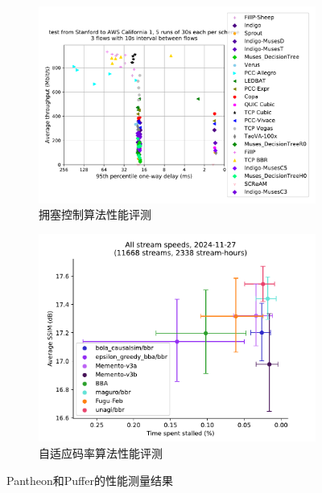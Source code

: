 \begin{figure}[ht]
\centering
\begin{subfigure}[t]{0.49\linewidth}
  \centering
  \includegraphics[width=\linewidth]{figures/chap02/measument-ccabr/cc.pdf}
  \caption{拥塞控制算法性能评测}
  \label{fig-measument-ccabr-cc}
\end{subfigure}%
\begin{subfigure}[t]{0.49\linewidth}
  \centering
  \includegraphics[width=\linewidth]{figures/chap02/measument-ccabr/abr.pdf}
  \caption{自适应码率算法性能评测}
  \label{fig-measument-ccabr-abr}
\end{subfigure}

\caption{Pantheon\cite{yan2018pantheon}和Puffer\cite{yan2020learning}的性能测量结果}
\label{fig-mea-ccabr}
\end{figure}
